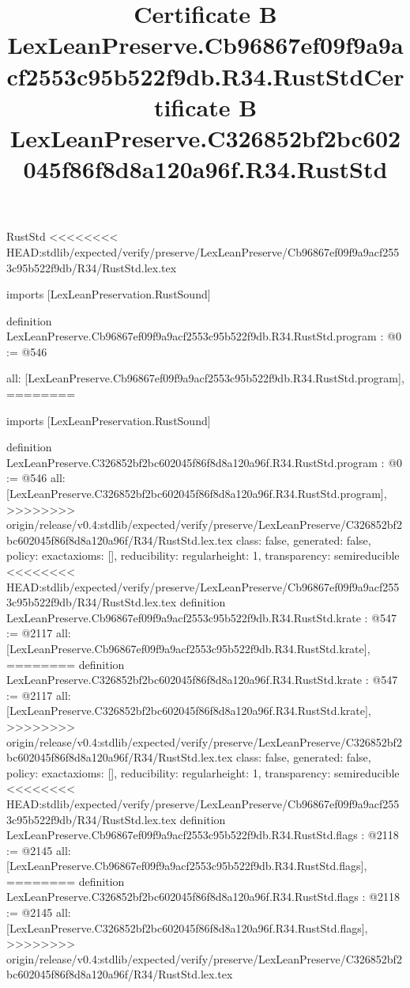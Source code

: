 \begin{lexlean}{RustStd}
<<<<<<<< HEAD:stdlib/expected/verify/preserve/LexLeanPreserve/Cb96867ef09f9a9acf2553c95b522f9db/R34/RustStd.lex.tex
\title{Certificate B LexLeanPreserve.Cb96867ef09f9a9acf2553c95b522f9db.R34.RustStd}
\begin{coremodule}
imports [LexLeanPreservation.RustSound]

definition LexLeanPreserve.Cb96867ef09f9a9acf2553c95b522f9db.R34.RustStd.program : @0 := @546 {
  all: [LexLeanPreserve.Cb96867ef09f9a9acf2553c95b522f9db.R34.RustStd.program],
========
\title{Certificate B LexLeanPreserve.C326852bf2bc602045f86f8d8a120a96f.R34.RustStd}
\begin{coremodule}
imports [LexLeanPreservation.RustSound]

definition LexLeanPreserve.C326852bf2bc602045f86f8d8a120a96f.R34.RustStd.program : @0 := @546 {
  all: [LexLeanPreserve.C326852bf2bc602045f86f8d8a120a96f.R34.RustStd.program],
>>>>>>>> origin/release/v0.4:stdlib/expected/verify/preserve/LexLeanPreserve/C326852bf2bc602045f86f8d8a120a96f/R34/RustStd.lex.tex
  class: false,
  generated: false,
  policy: exact{axioms: []},
  reducibility: regular{height: 1},
  transparency: semireducible
}
<<<<<<<< HEAD:stdlib/expected/verify/preserve/LexLeanPreserve/Cb96867ef09f9a9acf2553c95b522f9db/R34/RustStd.lex.tex
definition LexLeanPreserve.Cb96867ef09f9a9acf2553c95b522f9db.R34.RustStd.krate : @547 := @2117 {
  all: [LexLeanPreserve.Cb96867ef09f9a9acf2553c95b522f9db.R34.RustStd.krate],
========
definition LexLeanPreserve.C326852bf2bc602045f86f8d8a120a96f.R34.RustStd.krate : @547 := @2117 {
  all: [LexLeanPreserve.C326852bf2bc602045f86f8d8a120a96f.R34.RustStd.krate],
>>>>>>>> origin/release/v0.4:stdlib/expected/verify/preserve/LexLeanPreserve/C326852bf2bc602045f86f8d8a120a96f/R34/RustStd.lex.tex
  class: false,
  generated: false,
  policy: exact{axioms: []},
  reducibility: regular{height: 1},
  transparency: semireducible
}
<<<<<<<< HEAD:stdlib/expected/verify/preserve/LexLeanPreserve/Cb96867ef09f9a9acf2553c95b522f9db/R34/RustStd.lex.tex
definition LexLeanPreserve.Cb96867ef09f9a9acf2553c95b522f9db.R34.RustStd.flags : @2118 := @2145 {
  all: [LexLeanPreserve.Cb96867ef09f9a9acf2553c95b522f9db.R34.RustStd.flags],
========
definition LexLeanPreserve.C326852bf2bc602045f86f8d8a120a96f.R34.RustStd.flags : @2118 := @2145 {
  all: [LexLeanPreserve.C326852bf2bc602045f86f8d8a120a96f.R34.RustStd.flags],
>>>>>>>> origin/release/v0.4:stdlib/expected/verify/preserve/LexLeanPreserve/C326852bf2bc602045f86f8d8a120a96f/R34/RustStd.lex.tex
}}}
\end{coremodule}}
\end{coremodule}
\end{lexlean}
